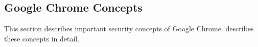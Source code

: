 \subsection{Google Chrome Concepts}
This section describes important security concepts of Google Chrome. \cite{chromium_security_architecture} describes these concepts in detail.
